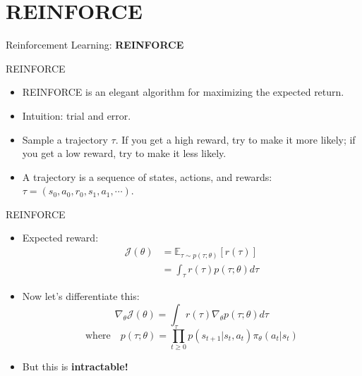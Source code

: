 \section{REINFORCE}
\begin{frame}{}
    \LARGE Reinforcement Learning: \textbf{REINFORCE}
\end{frame}

\begin{frame}{REINFORCE}
\begin{itemize}
    \setlength{\itemsep}{1em}
    \item REINFORCE is an elegant algorithm for maximizing the expected return.
    \item Intuition: trial and error.
    \item Sample a trajectory $\tau$. If you get a high reward, try to make it more likely; if you get a low reward, try to make it less likely.
    \item A trajectory is a sequence of states, actions, and rewards: $\tau = (s_0, a_0, r_0, s_1, a_1, \cdots)$.
\end{itemize}
\end{frame}

\begin{frame}{REINFORCE}
\begin{itemize}
    \item Expected reward:
        \begin{equation*}
        \begin{split}
            \mathcal{J}(\theta) & = \mathbb{E}_{\tau \sim p(\tau;\theta)}\left[ r(\tau) \right] \\
            & = \int_\tau r(\tau) p(\tau;\theta) d\tau 
        \end{split}
        \end{equation*}
    \pause
    \item Now let’s differentiate this:
        $$
        \nabla_\theta \mathcal{J}(\theta) = \int_\tau r(\tau) \nabla_\theta p(\tau;\theta) d\tau
        $$
        $$
        \text{where} \quad p(\tau;\theta) = \prod_{t \geq 0} p(s_{t+1}|s_t, a_t) \pi_\theta(a_t|s_t)
        $$
    \pause
    \item But this is \textbf{intractable!}
\end{itemize}
\end{frame}

